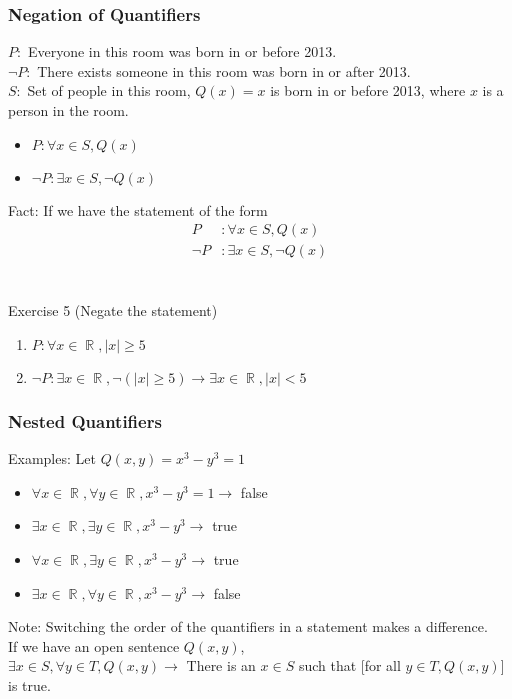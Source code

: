 \documentclass[10pt]{article}
\DeclareMathOperator{\R}{{\mathbb{R}}}
\theoremstyle{break}
\begin{document}
\subsubsection{Negation of Quantifiers}
$P: $ Everyone in this room was born in or before 2013. \\
$\neg P: $ There exists someone in this room was born in or after 2013.\\
$S: $ Set of people in this room, $Q(x) = x$ is born in or before 2013, where $x$ is a person in the room.
\begin{itemize}
    \item $P: \forall x \in S, Q(x)$
    \item $\neg P: \exists x \in S, \neg Q(x)$
\end{itemize}
Fact: If we have the statement of the form 
\begin{align*}
    P&: \forall x \in S, Q(x)\\
    \neg P&: \exists x \in S, \neg Q(x)
\end{align*}
\\ \vspace{1ex} \\
Exercise 5 (Negate the statement)
\begin{enumerate}
    \item $P: \forall x \in \R, |x| \ge 5$
    \item $\neg P: \exists x \in \R, \neg(|x| \ge 5) \to \exists x \in \R, |x| < 5$
\end{enumerate}
\subsubsection{Nested Quantifiers}
Examples:
Let $Q(x, y) = x^3 - y^3 = 1$
\begin{itemize}
    \item $\forall x \in \R, \forall y \in \R, x^3 - y^3 = 1 \to $ false
    \item $\exists x \in \R, \exists y \in \R, x^3 - y^3 \to $ true
    \item $\forall x \in \R, \exists y \in \R, x^3 - y^3 \to $ true
    \item $\exists x \in \R, \forall y \in \R, x^3 - y^3 \to $ false
\end{itemize}
Note: Switching the order of the quantifiers in a statement makes a difference.\\
If we have an open sentence $Q(x, y)$,\\
$\exists x \in S, \forall y \in T, Q(x, y) \to $ There is an $x \in S$ such that [for all $y \in T, Q(x,y)$] is true.
\end{document}

